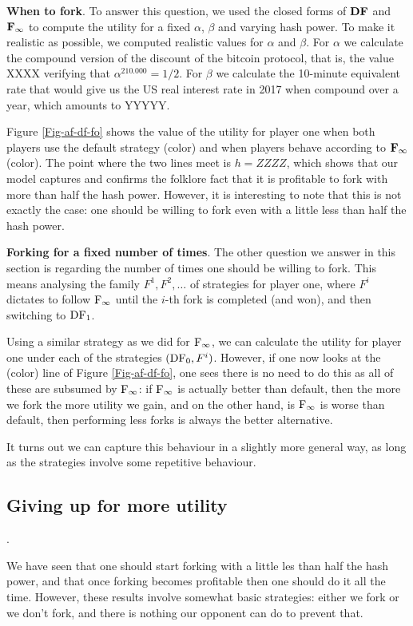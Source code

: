 \medskip
\noindent
\textbf{When to fork}. To answer this question, we used the closed forms of $\text{\rm {\bf DF}}$ and ${\rm {\bf F_\infty}}$ to compute the utility for a fixed $\alpha$, $\beta$ and varying hash power. 
To make it realistic as possible, we computed realistic values for $\alpha$ and $\beta$. For $\alpha$ we calculate the compound version of the discount of the bitcoin protocol, that is, 
the value XXXX verifying that $\alpha^{210.000} = 1/2$. 
For $\beta$ we calculate the 10-minute equivalent rate that would give us the US real interest rate in 2017 when compound over a year, which amounts to YYYYY. 

Figure \ref{Fig-af-df-fo} shows the value of the utility for player one when both players use the default strategy (color) and when players behave according to ${\rm {\bf F_\infty}}$ (color). 
The point where the two lines meet is $h = ZZZZ$, which shows that our model captures and confirms the folklore fact that it is profitable to fork with more than half the hash power. However, it is interesting to note that this is not exactly the case: one should be willing to fork even with a little less than half the hash power. 


\medskip
\noindent
\textbf{Forking for a fixed number of times}. The other question we answer in this section is regarding the number of times one should be willing to fork. 
This means analysing the family $F^1, F^2, \dots$ of strategies for player one, where $F^i$ dictates to follow ${\rm {F_\infty}}$ until the $i$-th fork is completed (and won), and then 
switching to $\text{\rm DF}_1$. 

Using a similar strategy as we did for ${\rm {F_\infty}}$, we can calculate the utility for player one under each of the strategies $(\text{\rm DF}_0,F^i)$. However, if one now looks at the (color) line 
of Figure \ref{Fig-af-df-fo}, one sees there is no need to do this as all of these are subsumed by ${\rm {F_\infty}}$: if ${\rm {F_\infty}}$ is actually better than default, then the more we fork the more utility we gain, and on the other hand, 
is ${\rm {F_\infty}}$ is worse than default, then  performing less forks is always the better alternative. 

It turns out we can capture this behaviour in a slightly more general way, as long as the strategies involve some repetitive behaviour. 


\subsection{Giving up for more utility}. 

We have seen that one should start forking with a little les than half the hash power, and that once forking becomes profitable then one should do it all the time. However, these results involve somewhat basic strategies: either we fork or we don't fork, and there is nothing our opponent can do to prevent that. 

